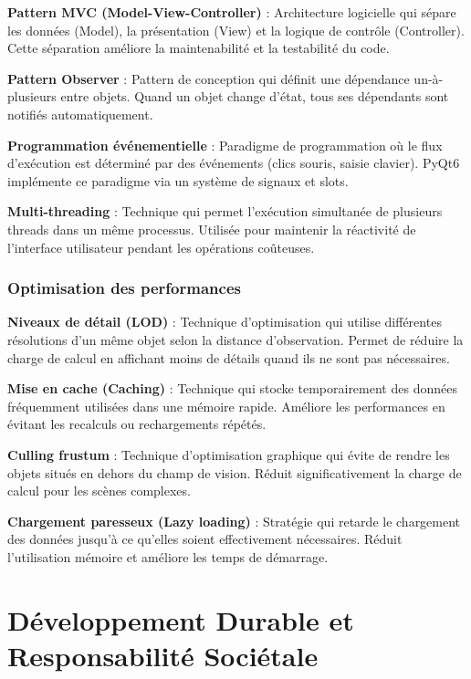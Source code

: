 \documentclass[12pt,a4paper]{report}
\let\oldchapter\chapter
\renewcommand{\chapter}{\clearpage\oldchapter}
\begin{document}
\textbf{Pattern MVC (Model-View-Controller)} : Architecture logicielle qui sépare les données (Model), la présentation (View) et la logique de contrôle (Controller). Cette séparation améliore la maintenabilité et la testabilité du code.

\textbf{Pattern Observer} : Pattern de conception qui définit une dépendance un-à-plusieurs entre objets. Quand un objet change d'état, tous ses dépendants sont notifiés automatiquement.

\textbf{Programmation événementielle} : Paradigme de programmation où le flux d'exécution est déterminé par des événements (clics souris, saisie clavier). PyQt6 implémente ce paradigme via un système de signaux et slots.

\textbf{Multi-threading} : Technique qui permet l'exécution simultanée de plusieurs threads dans un même processus. Utilisée pour maintenir la réactivité de l'interface utilisateur pendant les opérations coûteuses.

\subsection{Optimisation des performances}

\textbf{Niveaux de détail (LOD)} : Technique d'optimisation qui utilise différentes résolutions d'un même objet selon la distance d'observation. Permet de réduire la charge de calcul en affichant moins de détails quand ils ne sont pas nécessaires.

\textbf{Mise en cache (Caching)} : Technique qui stocke temporairement des données fréquemment utilisées dans une mémoire rapide. Améliore les performances en évitant les recalculs ou rechargements répétés.

\textbf{Culling frustum} : Technique d'optimisation graphique qui évite de rendre les objets situés en dehors du champ de vision. Réduit significativement la charge de calcul pour les scènes complexes.

\textbf{Chargement paresseux (Lazy loading)} : Stratégie qui retarde le chargement des données jusqu'à ce qu'elles soient effectivement nécessaires. Réduit l'utilisation mémoire et améliore les temps de démarrage.

\chapter{Développement Durable et Responsabilité Sociétale}

\clearpage
\end{document}
